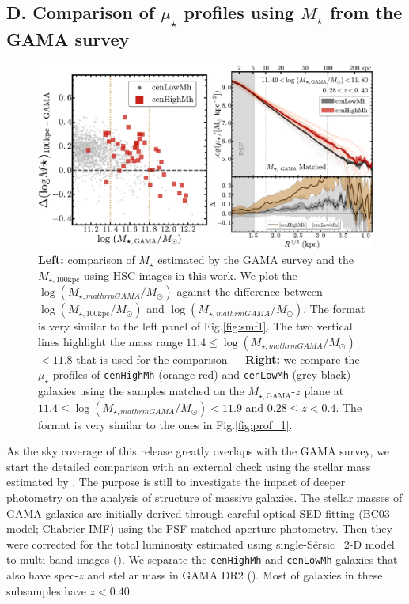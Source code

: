 \documentclass{emulateapj}
\def\ser{{S\'{e}rsic\ }}
\def\rbcg{\texttt{cenHighMh}}
\def\nbcg{\texttt{cenLowMh}}
\def\mstar{{$M_{\star}$}}
\def\mtot{{$M_{\star,100\mathrm{kpc}}$}}
\def\mgama{{$M_{\star,\mathrm{GAMA}}$}}
\def\logmtot{{$\log (M_{\star,100\mathrm{kpc}}/M_{\odot})$}}
\def\logmgama{{$\log (M_{\star,mathrm{GAMA}}/M_{\odot})$}}
\def\mden{{$\mu_{\star}$}}
\newcommand{\update}[1]{\textcolor{Bittersweet}{#1}}
\begin{document}
\begin{CJK*}{UTF8}{gbsn}

\section{D. Comparison of \mden{} profiles using \mstar{} from the GAMA survey}
    \label{app:C}

\begin{figure}[hbt!]
    \centering 
    \includegraphics[width=\textwidth]{fig/redbcg_prof_gama_new}
    \caption{
        \update{
        \textbf{Left:} comparison of \mstar{} estimated by the GAMA survey and 
        the \mtot{} using HSC images in this work. 
        We plot the \logmgama{} against the difference between \logmtot{} and \logmgama{}. 
        The format is very similar to the left panel of Fig.\ref{fig:smf1}. 
        The two vertical lines highlight the mass range $11.4 \leq$\logmgama{}$<11.8$ 
        that is used for the comparison.~~
        \textbf{Right:} we compare the \mden{} profiles of \rbcg{} (orange-red) and 
        \nbcg{} (grey-black) galaxies using the samples matched on the 
        \mgama{}-$z$ plane at $11.4 \leq$\logmgama{}$<11.9$ and $0.28 \leq z < 0.4$. 
        The format is very similar to the ones in Fig.\ref{fig:prof_1}.}
        }
    \label{fig:gama}
\end{figure}

    As the sky coverage of this release greatly overlaps with the GAMA survey,
    we start the detailed comparison with an external check using the stellar
    mass estimated by \citep{Taylor2011}. 
    The purpose is still to investigate the impact of deeper photometry on 
    the analysis of structure of massive galaxies.  
    The stellar masses of GAMA galaxies are initially derived through careful 
    optical-SED fitting (BC03 model; Chabrier IMF) using the PSF-matched 
    aperture photometry.  
    Then they were corrected for the total luminosity estimated using single-\ser{}
    2-D model to multi-band images (\citealt{Kelvin2012}).  
    We separate the \rbcg{} and \nbcg{} galaxies that also have 
    spec-$z$ and stellar mass in GAMA DR2 (\citealt{Liske2015}).
    Most of galaxies in these subsamples have $z < 0.40$. 
    

\end{CJK*}
\end{document}
